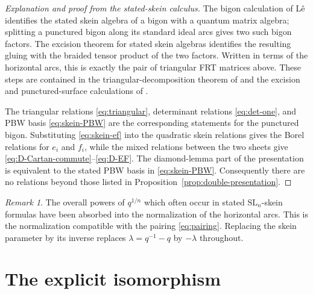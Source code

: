 \documentclass[11pt]{amsart}
\numberwithin{equation}{section}
\theoremstyle{definition}
\theoremstyle{remark}
\newtheorem{remark}[equation]{Remark}
\begin{document}
\begin{proof}[Explanation and proof from the stated-skein calculus]
The bigon calculation of L\^e identifies the stated skein algebra of a bigon
with a quantum matrix algebra; splitting a punctured bigon along its standard
ideal arcs gives two such bigon factors.  The excision theorem for stated
skein algebras identifies the resulting gluing with the braided tensor product
of the two factors.  Written in terms of the horizontal arcs, this is exactly
the pair of triangular FRT matrices above.  These steps are contained in the
triangular-decomposition theorem of \cite{LeTri} and the excision and
punctured-surface calculations of \cite{CL}.

The triangular relations \eqref{eq:triangular}, determinant relations
\eqref{eq:det-one}, and PBW basis \eqref{eq:skein-PBW} are the corresponding
statements for the punctured bigon.  Substituting \eqref{eq:skein-ef} into the
quadratic skein relations gives the Borel relations for \(e_i\) and \(f_i\),
while the mixed relations between the two sheets give
\eqref{eq:D-Cartan-commute}--\eqref{eq:D-EF}.  The diamond-lemma part of the
presentation is equivalent to the stated PBW basis in
\eqref{eq:skein-PBW}.  Consequently there are no relations beyond those listed
in Proposition~\ref{prop:double-presentation}.
\end{proof}

\begin{remark}
The overall powers of \(q^{1/n}\) which often occur in stated
\(\mathrm{SL}_n\)-skein formulas have been absorbed into the normalization of
the horizontal arcs.  This is the normalization compatible with the pairing
\eqref{eq:pairing}.  Replacing the skein parameter by its inverse replaces
\(\lambda=q^{-1}-q\) by \(-\lambda\) throughout.
\end{remark}

\section{The explicit isomorphism}
\end{document}
